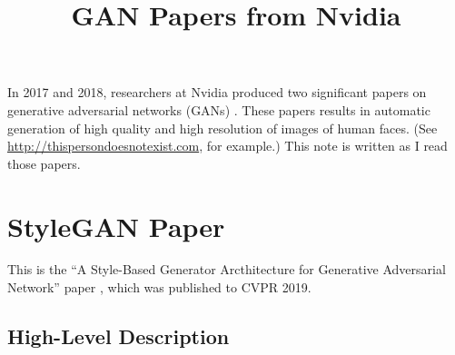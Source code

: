 \documentclass[10pt]{article}
\title{GAN Papers from Nvidia}
\begin{document}
  \maketitle

  In 2017 and 2018, researchers at Nvidia produced two significant papers on generative adversarial networks (GANs) \cite{Karras:2017, Karras:2018}. These papers results in automatic generation of high quality and high resolution of images of human faces. (See \url{http://thispersondoesnotexist.com}, for example.) This note is written as I read those papers.

  \section{StyleGAN Paper}

  This is the ``A Style-Based Generator Arcthitecture for Generative Adversarial Network'' paper \cite{Karras:2018}, which was published to CVPR 2019.

  \subsection{High-Level Description}
\end{document}
